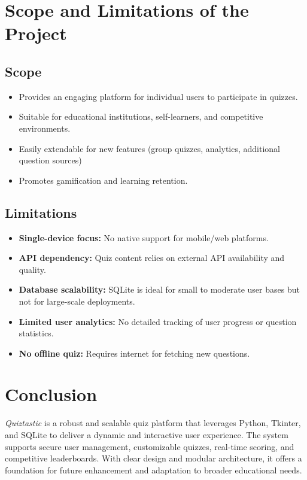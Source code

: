 \documentclass[12pt,a4paper]{article}
\begin{document}
\section{Scope and Limitations of the Project}

\subsection*{Scope}
\begin{itemize}
    \item Provides an engaging platform for individual users to participate in quizzes.
    \item Suitable for educational institutions, self-learners, and competitive environments.
    \item Easily extendable for new features (group quizzes, analytics, additional question sources)
    \item Promotes gamification and learning retention.
\end{itemize}

\subsection*{Limitations}
\begin{itemize}
    \item \textbf{Single-device focus:} No native support for mobile/web platforms.
    \item \textbf{API dependency:} Quiz content relies on external API availability and quality.
    \item \textbf{Database scalability:} SQLite is ideal for small to moderate user bases but not for large-scale deployments.
    \item \textbf{Limited user analytics:} No detailed tracking of user progress or question statistics.
    \item \textbf{No offline quiz:} Requires internet for fetching new questions.
\end{itemize}


\section*{Conclusion}

\noindent
\textit{Quiztastic} is a robust and scalable quiz platform that leverages Python, Tkinter, and SQLite to deliver a dynamic and interactive user experience. The system supports secure user management, customizable quizzes, real-time scoring, and competitive leaderboards. With clear design and modular architecture, it offers a foundation for future enhancement and adaptation to broader educational needs.
\end{document}
